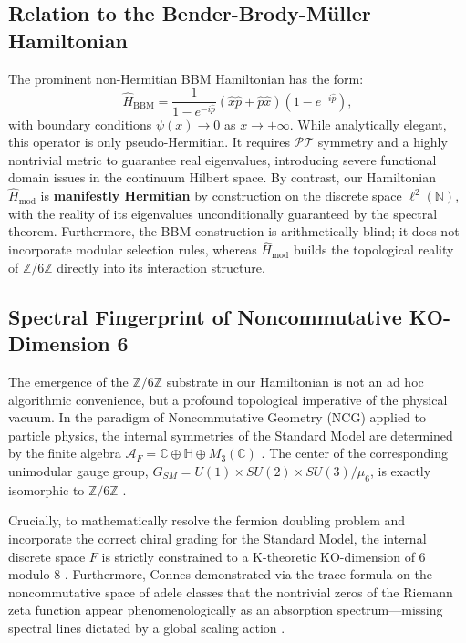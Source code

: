 \documentclass[aps,prl,preprint,superscriptaddress,floatfix]{revtex4-2}
\newcommand{\Zmod}{\mathbb{Z}/6\mathbb{Z}}
\begin{document}
\subsection{Relation to the Bender-Brody-M\"uller Hamiltonian}

The prominent non-Hermitian BBM Hamiltonian \cite{Bender2017} has the form:
\begin{equation}
\hat{H}_{\text{BBM}} = \frac{1}{1 - e^{-i\hat{p}}} (\hat{x}\hat{p} + \hat{p}\hat{x}) (1 - e^{-i\hat{p}}),
\end{equation}
with boundary conditions $\psi(x) \to 0$ as $x \to \pm\infty$. While analytically elegant, this operator is only pseudo-Hermitian. It requires $\mathcal{PT}$ symmetry and a highly nontrivial metric to guarantee real eigenvalues, introducing severe functional domain issues in the continuum Hilbert space. By contrast, our Hamiltonian $\hat{H}_{\text{mod}}$ is \textbf{manifestly Hermitian} by construction on the discrete space $\ell^2(\mathbb{N})$, with the reality of its eigenvalues unconditionally guaranteed by the spectral theorem. Furthermore, the BBM construction is arithmetically blind; it does not incorporate modular selection rules, whereas $\hat{H}_{\text{mod}}$ builds the topological reality of $\Zmod$ directly into its interaction structure.

\subsection{Spectral Fingerprint of Noncommutative KO-Dimension 6}

The emergence of the $\mathbb{Z}/6\mathbb{Z}$ substrate in our Hamiltonian is not an ad hoc algorithmic convenience, but a profound topological imperative of the physical vacuum. In the paradigm of Noncommutative Geometry (NCG) applied to particle physics, the internal symmetries of the Standard Model are determined by the finite algebra $\mathcal{A}_F = \mathbb{C} \oplus \mathbb{H} \oplus M_3(\mathbb{C})$ \cite{Chamseddine2007, Connes2008}. The center of the corresponding unimodular gauge group, $G_{SM} = U(1) \times SU(2) \times SU(3) / \mu_6$, is exactly isomorphic to $\mathbb{Z}/6\mathbb{Z}$ \cite{Connes2008}.

Crucially, to mathematically resolve the fermion doubling problem and incorporate the correct chiral grading for the Standard Model, the internal discrete space $F$ is strictly constrained to a K-theoretic KO-dimension of 6 modulo 8 \cite{Connes2008}. Furthermore, Connes demonstrated via the trace formula on the noncommutative space of adele classes that the nontrivial zeros of the Riemann zeta function appear phenomenologically as an absorption spectrum---missing spectral lines dictated by a global scaling action \cite{Connes1999}.
\end{document}
